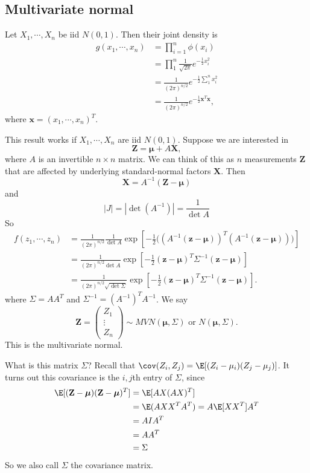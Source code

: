 \documentclass[a4paper]{article}
\begin{document}
\subsection{Multivariate normal}
Let $X_1, \cdots, X_n$ be iid $N(0, 1)$. Then their joint density is
\begin{align*}
  g(x_1, \cdots, x_n) &= \prod_{i = 1}^n \phi(x_i) \\
  &= \prod_{1}^n\frac{1}{\sqrt{2\pi}}e^{-\frac{1}{2}x_i^2}\\
  &= \frac{1}{(2\pi)^{n/2}} e^{-\frac{1}{2}\sum_1^n x_i^2}\\
  &= \frac{1}{(2\pi)^{n/2}}e^{-\frac{1}{2}\mathbf{x}^T \mathbf{x}},
\end{align*}
where $\mathbf{x} = (x_1, \cdots, x_n)^T$.

This result works if $X_1, \cdots, X_n$ are iid $N(0, 1)$. Suppose we are interested in
\[
  \mathbf{Z} = \boldsymbol\mu + A\mathbf{X},
\]
where $A$ is an invertible $n\times n$ matrix. We can think of this as $n$ measurements $\mathbf{Z}$ that are affected by underlying standard-normal factors $\mathbf{X}$. Then
\[
  \mathbf{X} = A^{-1}(\mathbf{Z} - \boldsymbol\mu)
\]
and
\[
  |J| = |\det (A^{-1})| = \frac{1}{\det A}
\]
So
\begin{align*}
  f(z_1, \cdots, z_n) &= \frac{1}{(2\pi)^{n/2}}\frac{1}{\det A}\exp\left[-\frac{1}{2}\big((A^{-1}(\mathbf{z} - \boldsymbol\mu))^T(A^{-1}(\mathbf{z} - \boldsymbol\mu))\big)\right]\\
  &= \frac{1}{(2\pi)^{n/2}\det A}\exp\left[-\frac{1}{2}(\mathbf{z} - \boldsymbol\mu)^T \Sigma^{-1}(\mathbf{z} - \boldsymbol\mu)\right]\\
  &= \frac{1}{(2\pi)^{n/2}\sqrt{\det \Sigma}}\exp\left[-\frac{1}{2}(\mathbf{z} - \boldsymbol\mu)^T \Sigma^{-1}(\mathbf{z} - \boldsymbol\mu)\right].
\end{align*}
where $\Sigma = AA^T$ and $\Sigma^{-1} = (A^{-1})^TA^{-1}$. We say
\[
  \mathbf{Z} =
  \begin{pmatrix}
    Z_1\\
    \vdots\\
    Z_n
  \end{pmatrix}
  \sim MVN(\boldsymbol\mu, \Sigma)\text{ or }N(\boldsymbol\mu, \Sigma).
\]
This is the multivariate normal.

What is this matrix $\Sigma$? Recall that $\cov(Z_i, Z_j) = \E[(Z_i - \mu_i)(Z_j - \mu_j)]$. It turns out this covariance is the $i, j$th entry of $\Sigma$, since
\begin{align*}
  \E[(\mathbf{Z} - \boldsymbol\mu)(\mathbf{Z} - \boldsymbol\mu)^T] &= \E[AX(AX)^T]\\
  &= \E(AXX^TA^T) = A\E[XX^T]A^T\\
  &= AIA^T\\
  &= AA^T \\
  &= \Sigma
\end{align*}
So we also call $\Sigma$ the covariance matrix.
\end{document}
